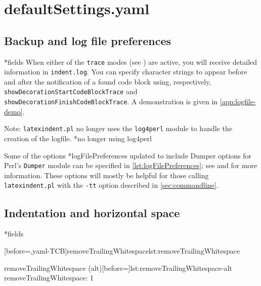 \section{defaultSettings.yaml}\label{sec:defuseloc}
\subsection{Backup and log file preferences}
*{fields}
	When%
	 either of
	the \texttt{trace} modes (see ) are active, you will receive
	detailed information in \texttt{indent.log}. You can specify character strings to appear
	before and after the notification of a found code block using, respectively,
	\texttt{showDecorationStartCodeBlockTrace} and
	\texttt{showDecorationFinishCodeBlockTrace}. A demonstration is given in
	\vref{app:logfile-demo}.

	Note: \texttt{latexindent.pl} no longer uses the \texttt{log4perl} module to handle the
	creation of the logfile. *{no longer using log4perl}%

	Some of the options *{logFilePreferences updated to include Dumper
		options} for Perl's \texttt{Dumper} module can be specified in
	\cref{lst:logFilePreferences}; see \cite{dumper} and \cite{dumperdemo} for more
	information. These options will mostly be helpful for those calling
	\texttt{latexindent.pl} with the \texttt{-tt} option described in \cref{sec:commandline}.%

\subsection{Indentation and horizontal space}
*{fields}\label{yaml:removeTrailingWhitespace}

	\begin{minipage}{.4\textwidth}
		[before=\centering,yaml-TCB]{removeTrailingWhitespace}{lst:removeTrailingWhitespace}
	\end{minipage}%
	\hfill
	\begin{minipage}{.5\textwidth}
		\begin{yaml}[numbers=none]{removeTrailingWhitespace (alt)}[before=\centering]{lst:removeTrailingWhitespace-alt}
removeTrailingWhitespace: 1
\end{yaml}
	\end{minipage}%
